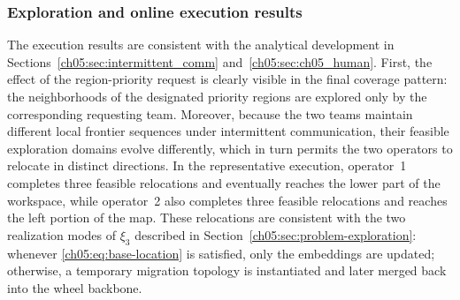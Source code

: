 \subsubsection{Exploration and online execution results}
\label{ch05:subsubsec:case_results}

The execution results are consistent with the analytical development in
Sections~\ref{ch05:sec:intermittent_comm} and~\ref{ch05:sec:ch05_human}.
First, the effect of the region-priority request is clearly visible in
the final coverage pattern: the neighborhoods of the designated
priority regions are explored only by the corresponding requesting
team. Moreover, because the two teams maintain different local frontier
sequences under intermittent communication, their feasible exploration
domains evolve differently, which in turn permits the two operators to
relocate in distinct directions. In the representative execution,
operator~1 completes three feasible relocations and eventually reaches
the lower part of the workspace, while operator~2 also completes three
feasible relocations and reaches the left portion of the map. These
relocations are consistent with the two realization modes of \(\xi_3\)
described in Section~\ref{ch05:sec:problem-exploration}: whenever
\eqref{ch05:eq:base-location} is satisfied, only the embeddings are
updated; otherwise, a temporary migration topology is instantiated and
later merged back into the wheel backbone.

